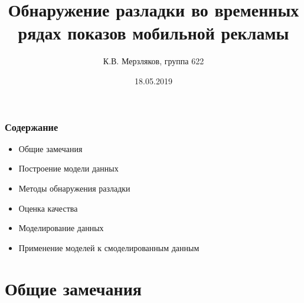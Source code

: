 \documentclass[intlimits, 9pt, unicode]{beamer}
\title{Обнаружение разладки во временных рядах показов мобильной рекламы}
\author{К.В. Мерзляков, группа 622}
\institute{Санкт-Петербургский Государственный Университет \\
     Кафедра статистического моделирования
}
\date{
    18.05.2019
}
\begin{document}
\begin{frame}
    \titlepage
\end{frame}

\begin{frame}
    \frametitle{Содержание}



    \begin{itemize}
    	\item Общие замечания
    \vspace{0.5cm}
	 \item Построение модели данных
    \vspace{0.5cm}
        \item Методы обнаружения разладки
    \vspace{0.5cm}
        \item Оценка качества
    \vspace{0.5cm}
        \item Моделирование данных
    \vspace{0.5cm}
        \item Применение моделей к смоделированным данным
    \end{itemize}


\end{frame}



\section{Общие замечания}
\end{document}
